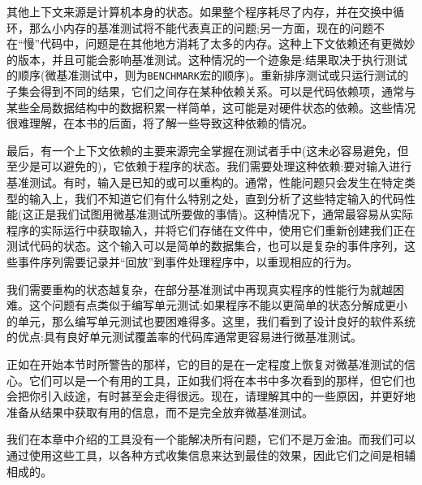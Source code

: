 其他上下文来源是计算机本身的状态。如果整个程序耗尽了内存，并在交换中循环，那么小内存的基准测试将不能代表真正的问题;另一方面，现在的问题不在“慢”代码中，问题是在其他地方消耗了太多的内存。这种上下文依赖还有更微妙的版本，并且可能会影响基准测试。这种情况的一个迹象是:结果取决于执行测试的顺序(微基准测试中，则为\texttt{BENCHMARK}宏的顺序)。重新排序测试或只运行测试的子集会得到不同的结果，它们之间存在某种依赖关系。可以是代码依赖项，通常与某些全局数据结构中的数据积累一样简单，这可能是对硬件状态的依赖。这些情况很难理解，在本书的后面，将了解一些导致这种依赖的情况。

最后，有一个上下文依赖的主要来源完全掌握在测试者手中(这未必容易避免，但至少是可以避免的)，它依赖于程序的状态。我们需要处理这种依赖:要对输入进行基准测试。有时，输入是已知的或可以重构的。通常，性能问题只会发生在特定类型的输入上，我们不知道它们有什么特别之处，直到分析了这些特定输入的代码性能(这正是我们试图用微基准测试所要做的事情)。这种情况下，通常最容易从实际程序的实际运行中获取输入，并将它们存储在文件中，使用它们重新创建我们正在测试代码的状态。这个输入可以是简单的数据集合，也可以是复杂的事件序列，这些事件序列需要记录并“回放”到事件处理程序中，以重现相应的行为。

我们需要重构的状态越复杂，在部分基准测试中再现真实程序的性能行为就越困难。这个问题有点类似于编写单元测试:如果程序不能以更简单的状态分解成更小的单元，那么编写单元测试也要困难得多。这里，我们看到了设计良好的软件系统的优点:具有良好单元测试覆盖率的代码库通常更容易进行微基准测试。

正如在开始本节时所警告的那样，它的目的是在一定程度上恢复对微基准测试的信心。它们可以是一个有用的工具，正如我们将在本书中多次看到的那样，但它们也会把你引入歧途，有时甚至会走得很远。现在，请理解其中的一些原因，并更好地准备从结果中获取有用的信息，而不是完全放弃微基准测试。

我们在本章中介绍的工具没有一个能解决所有问题，它们不是万金油。而我们可以通过使用这些工具，以各种方式收集信息来达到最佳的效果，因此它们之间是相辅相成的。






